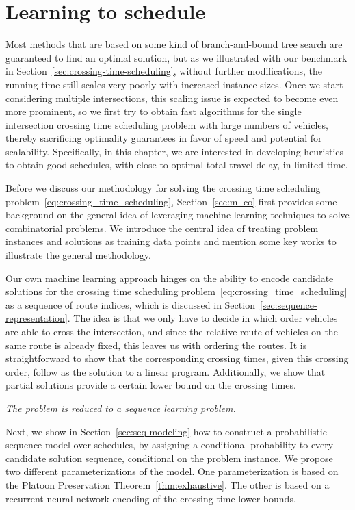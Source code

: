 \documentclass[a4paper]{report}
\theoremstyle{definition}
\theoremstyle{plain}
\begin{document}
\chapter{Learning to schedule}\label{chap:single-learning}

Most methods that are based on some kind of branch-and-bound tree search are
guaranteed to find an optimal solution, but as we illustrated with our benchmark
in Section~\ref{sec:crossing-time-scheduling}, without further modifications, the running time still scales
very poorly with increased instance sizes.
%
Once we start considering multiple intersections, this scaling issue is expected
to become even more prominent, so we first try to obtain fast algorithms for the
single intersection crossing time scheduling problem with large numbers of
vehicles, thereby sacrificing optimality guarantees in favor of speed and
potential for scalability.
%
Specifically, in this chapter, we are interested in developing heuristics to
obtain good schedules, with close to optimal total travel delay, in limited
time.

Before we discuss our methodology for solving the crossing time scheduling
problem~\eqref{eq:crossing_time_scheduling}, Section~\ref{sec:ml-co} first
provides some background on the general idea of leveraging machine learning
techniques to solve combinatorial problems.
%
We introduce the central idea of treating problem instances and solutions as
training data points and mention some key works to illustrate the general
methodology.

Our own machine learning approach hinges on the ability to encode candidate
solutions for the crossing time scheduling
problem~\eqref{eq:crossing_time_scheduling} as a sequence of route indices,
which is discussed in Section~\ref{sec:sequence-representation}.
%
The idea is that we only have to decide in which order vehicles are able to
cross the intersection, and since the relative route of vehicles on the same
route is already fixed, this leaves us with ordering the routes.
%
It is straightforward to show that the corresponding crossing times, given this
crossing order, follow as the solution to a linear program.
%
Additionally, we show that partial solutions provide a certain lower bound on
the crossing times.

\emph{The problem is reduced to a sequence learning problem.}

Next, we show in Section~\ref{sec:seq-modeling} how to construct a probabilistic
sequence model over schedules, by assigning a conditional probability to every
candidate solution sequence, conditional on the problem instance.
%
We propose two different parameterizations of the model.
%
One parameterization is based on the Platoon Preservation
Theorem~\ref{thm:exhaustive}. The other is based on a recurrent neural network
encoding of the crossing time lower bounds.
\end{document}
